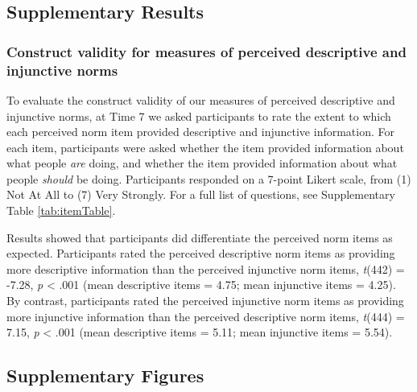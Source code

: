 \documentclass[
  man, donotrepeattitle,mask,floatsintext]{apa6}
\begin{document}
\hypertarget{supplementary-results}{%
\subsection{Supplementary Results}\label{supplementary-results}}

\hypertarget{construct-validity-for-measures-of-perceived-descriptive-and-injunctive-norms}{%
\subsubsection{Construct validity for measures of perceived descriptive and injunctive norms}\label{construct-validity-for-measures-of-perceived-descriptive-and-injunctive-norms}}

To evaluate the construct validity of our measures of perceived descriptive and injunctive norms, at Time 7 we asked participants to rate the extent to which each perceived norm item provided descriptive and injunctive information. For each item, participants were asked whether the item provided information about what people \emph{are} doing, and whether the item provided information about what people \emph{should} be doing. Participants responded on a 7-point Likert scale, from (1) Not At All to (7) Very Strongly. For a full list of questions, see Supplementary Table \ref{tab:itemTable}.

Results showed that participants did differentiate the perceived norm items as expected. Participants rated the perceived descriptive norm items as providing more descriptive information than the perceived injunctive norm items, \emph{t}(442) = -7.28, \emph{p} \textless{} .001 (mean descriptive items = 4.75; mean injunctive items = 4.25). By contrast, participants rated the perceived injunctive norm items as providing more injunctive information than the perceived descriptive norm items, \emph{t}(444) = 7.15, \emph{p} \textless{} .001 (mean descriptive items = 5.11; mean injunctive items = 5.54).

\newpage

\hypertarget{supplementary-figures}{%
\subsection{Supplementary Figures}\label{supplementary-figures}}
\end{document}
